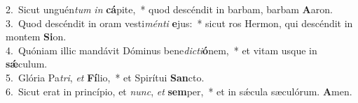 {2.~}Sicut unguén\textit{tum} \textit{in} \textbf{cá}pite,~* quod descéndit in barbam, barbam \textbf{A}aron.\\
{3.~}Quod descéndit in oram vesti\textit{mén}\textit{ti} \textbf{e}jus:~* sicut ros Hermon, qui descéndit in montem \textbf{Si}on.\\
{4.~}Quóniam illic mandávit Dóminus bene\textit{di}\textit{cti}\textbf{ó}nem,~* et vitam usque in \textbf{sǽ}culum.\\
{5.~}Glória Pa\textit{tri}, \textit{et} \textbf{Fí}lio,~* et Spirítui \textbf{San}cto.\\
{6.~}Sicut erat in princípio, et \textit{nunc}, \textit{et} \textbf{sem}per,~* et in sǽcula sæculórum. \textbf{A}men.\\
